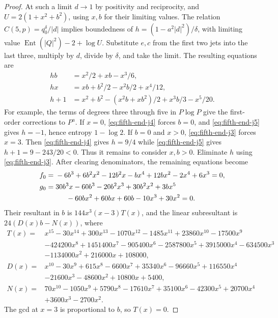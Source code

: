 \documentclass[11pt]{article}
\begin{document}
\begin{proof}
At such a limit \(d\to1\) by positivity and reciprocity, and
\(U=2(1+x^2+b^2)\), using \(x,b\) for their limiting values.
The relation \(C(5,p)=q_0^\delta/|d|\) implies boundedness of
\(h=(1-a^2|d|^2)/\delta\), with limiting value
\(\operatorname{Ent}(|Q|^2)-2+\log U\). Substitute \(e,c\) from
the first two jets into the last three, multiply by \(d\),
divide by \(\delta\), and take the limit. The resulting equations
are
\begin{align}
 hb&=x^2/2+xb-x^3/6,\label{eq:fifth-end-j3}\\
 hx&=xb+b^2/2-x^2b/2+x^4/12,\label{eq:fifth-end-j4}\\
 h+1&=x^2+b^2-(x^2b+xb^2)/2+x^3b/3-x^5/20.\label{eq:fifth-end-j5}
\end{align}
For example, the terms of degrees three through five in
\(P\log P\) give the first-order corrections to \(P^a\).
If \(x=0\), \eqref{eq:fifth-end-j4} forces \(b=0\), and
\eqref{eq:fifth-end-j5} gives \(h=-1\), hence entropy \(1-\log2\).
If \(b=0\) and \(x>0\), \eqref{eq:fifth-end-j3} forces \(x=3\).
Then \eqref{eq:fifth-end-j4} gives \(h=9/4\) while
\eqref{eq:fifth-end-j5} gives \(h+1=9-243/20<0\).
Thus it remains to consider \(x,b>0\). Eliminate \(h\) using \eqref{eq:fifth-end-j3}.
After clearing denominators, the remaining equations become
\begin{align*}
 f_0={}&-6b^3+6b^2x^2-12b^2x-bx^4+12bx^2-2x^4+6x^3=0,\\
 g_0={}&30b^3x-60b^3-20b^2x^3+30b^2x^2+3bx^5\\
       &\hspace{1.5em}{}-60bx^2+60bx+60b-10x^3+30x^2=0 .
\end{align*}
Their resultant in \(b\) is \(144x^3(x-3)T(x)\), and the linear
subresultant is \(24(D(x)b-N(x))\), where
\begin{align*}
 T(x)={}&x^{15}-30x^{14}+300x^{13}-1070x^{12}-1485x^{11}
         +23860x^{10}-17500x^9\\
 &-424200x^8+1451400x^7-905400x^6-2587800x^5
         +3915000x^4-634500x^3\\
 &-1134000x^2+216000x+108000,\\
 D(x)={}&x^{10}-30x^9+615x^8-6600x^7+35340x^6-96660x^5
        +116550x^4\\
 &-21600x^3-48600x^2+10800x+5400,\\
 N(x)={}&70x^{10}-1050x^9+5790x^8-17610x^7+35100x^6-42300x^5
        +20700x^4\\
 &+3600x^3-2700x^2 .
\end{align*}
The gcd at \(x=3\) is proportional to \(b\), so \(T(x)=0\).

\end{proof}
\end{document}
